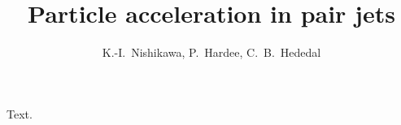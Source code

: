 \documentclass{cimento}
\title{Particle acceleration in pair jets}
\author{K.-I.~Nishikawa\ETC, P.~Hardee, C.~B.~Hededal}
\begin{document}
\maketitle
Text.
\end{document}
